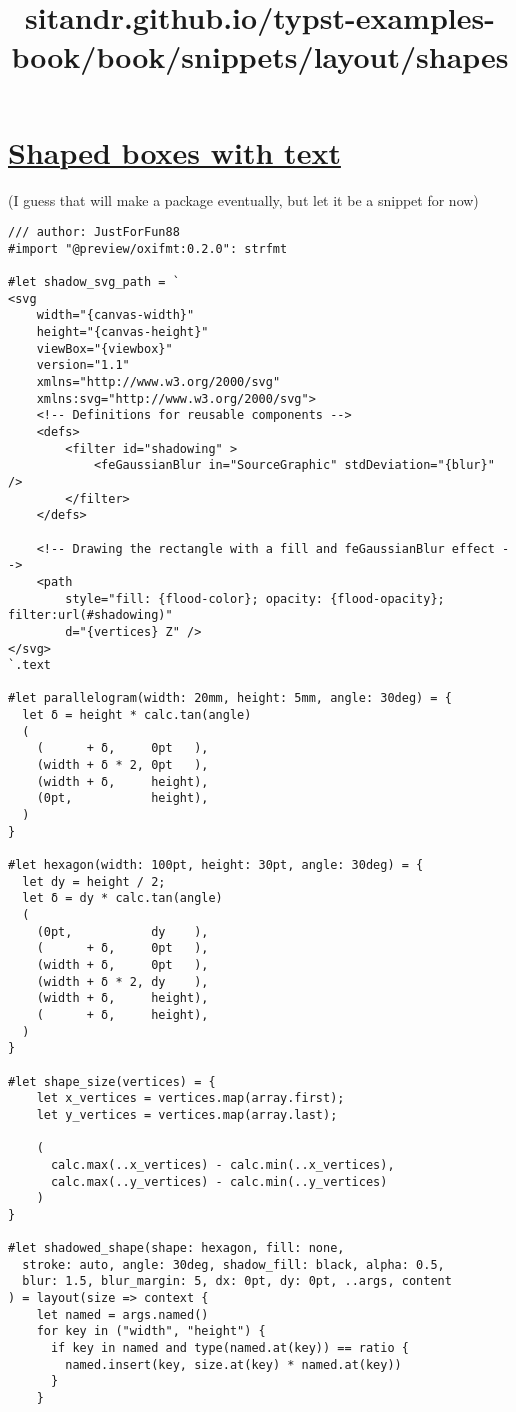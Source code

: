 \title{sitandr.github.io/typst-examples-book/book/snippets/layout/shapes}

\section{\texorpdfstring{\hyperref[shaped-boxes-with-text]{Shaped boxes
with text}}{Shaped boxes with text}}\label{shaped-boxes-with-text}

(I guess that will make a package eventually, but let it be a snippet
for now)

\begin{verbatim}
/// author: JustForFun88
#import "@preview/oxifmt:0.2.0": strfmt

#let shadow_svg_path = `
<svg
    width="{canvas-width}"
    height="{canvas-height}"
    viewBox="{viewbox}"
    version="1.1"
    xmlns="http://www.w3.org/2000/svg"
    xmlns:svg="http://www.w3.org/2000/svg">
    <!-- Definitions for reusable components -->
    <defs>
        <filter id="shadowing" >
            <feGaussianBlur in="SourceGraphic" stdDeviation="{blur}" />
        </filter>
    </defs>

    <!-- Drawing the rectangle with a fill and feGaussianBlur effect -->
    <path
        style="fill: {flood-color}; opacity: {flood-opacity}; filter:url(#shadowing)"
        d="{vertices} Z" />
</svg>
`.text

#let parallelogram(width: 20mm, height: 5mm, angle: 30deg) = {
  let δ = height * calc.tan(angle)
  (
    (      + δ,     0pt   ),
    (width + δ * 2, 0pt   ),
    (width + δ,     height),
    (0pt,           height),
  )
}

#let hexagon(width: 100pt, height: 30pt, angle: 30deg) = {
  let dy = height / 2;
  let δ = dy * calc.tan(angle)
  (
    (0pt,           dy    ),
    (      + δ,     0pt   ),
    (width + δ,     0pt   ),
    (width + δ * 2, dy    ),
    (width + δ,     height),
    (      + δ,     height),
  )
}

#let shape_size(vertices) = {
    let x_vertices = vertices.map(array.first);
    let y_vertices = vertices.map(array.last);

    (
      calc.max(..x_vertices) - calc.min(..x_vertices),
      calc.max(..y_vertices) - calc.min(..y_vertices)
    )
}

#let shadowed_shape(shape: hexagon, fill: none,
  stroke: auto, angle: 30deg, shadow_fill: black, alpha: 0.5, 
  blur: 1.5, blur_margin: 5, dx: 0pt, dy: 0pt, ..args, content
) = layout(size => context {
    let named = args.named()
    for key in ("width", "height") {
      if key in named and type(named.at(key)) == ratio {
        named.insert(key, size.at(key) * named.at(key))
      }
    }


\end{verbatim}
